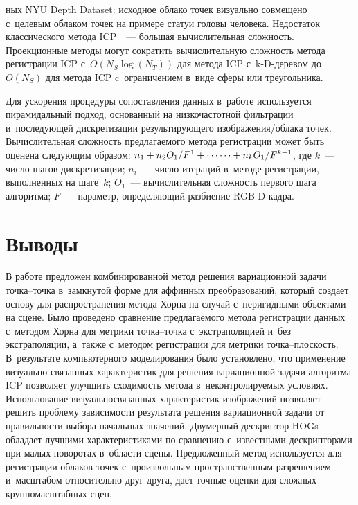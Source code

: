 \begin{multicols}{2}

\noindent
ных NYU Depth 
Dataset: исходное облако точек визуально совмещено с~целевым облаком точек 
на примере статуи головы человека. Недостаток классического метода 
ICP~\cite{6-voh}~--- большая вычислительная слож\-ность. Проекционные 
методы могут сократить вы\-чис\-ли\-тель\-ную слож\-ность метода регистрации ICP 
с~$O(N_S\log(N_T))$ для метода ICP с~k-D-де\-ре\-вом до~$O(N_S)$ для метода 
ICP c~ограничением в~виде сферы или треугольника.
  
  
  
  Для ускорения процедуры сопоставления данных в~работе используется 
пирамидальный подход, основанный на низкочастотной фильт\-ра\-ции 
и~по\-сле\-ду\-ющей дискретизации результирующего изоб\-ра\-же\-ния/об\-ла\-ка 
точек. Вы\-чис\-ли\-тель\-ная слож\-ность пред\-ла\-га\-емо\-го метода регистрации может 
быть оценена сле\-ду\-ющим образом: $n_1+ n_2O_1/F^1+\cdots\linebreak \cdots +  
n_kO_1/F^{k-1}$,  где $k$~--- чис\-ло шагов дискретизации; $n_i$~--- чис\-ло 
итераций в~методе регистрации, выполненных на шаге~$k$; $O_1$~--- 
вы\-чис\-ли\-тель\-ная слож\-ность первого шага алгоритма; $F$~--- параметр, 
опре\-де\-ля\-ющий разбиение RGB-D-кадра.

\vspace*{-6pt}

\section{Выводы}

  В работе предложен комбинированной метод решения вариационной задачи 
точка--точка в~замк\-ну\-той форме для аффинных преобразований, который 
создает основу для распространения метода Хорна на случай с~неригидными 
объектами на сцене. Было проведено сравнение пред\-ла\-га\-емо\-го метода 
регистрации данных с~методом Хорна для метрики точ\-ка--точ\-ка 
с~экстраполяцией и~без экстраполяции, а~также с~методом регистрации для\linebreak 
метрики точ\-ка--плос\-кость. В~результате компьютерного моделирования было 
установлено, что применение визуально связанных характеристик для решения 
вариационной задачи алгоритма ICP позво\-ля\-ет улучшить сходимость метода 
в~неконтролируемых условиях. Использование визуально\linebreak связанных 
характеристик изображений поз\-во\-ля\-ет решить проб\-ле\-му за\-ви\-си\-мости 
результата решения вариационной задачи от пра\-виль\-ности выбора начальных 
значений. Двумерный дескриптор HOGs обладает лучшими характеристиками 
по сравнению с~известными дескрипторами при малых поворотах в~об\-ласти 
сцены. Предложенный метод используется для регистрации облаков точек 
с~произвольным пространственным разрешением и~масштабом относительно 
друг друга, дает точные оценки для слож\-ных крупномасштабных сцен.
  

\end{multicols}
